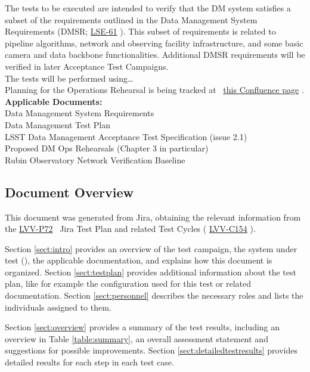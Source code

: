 \documentclass[DM,lsstdraft,STR,toc]{lsstdoc}
\begin{document}
 The tests to be executed are intended to verify that the DM system
satisfies a subset of the requirements outlined in the Data Management
System Requirements (DMSR; \href{https://lse-61.lsst.io/}{LSE-61} ).
This subset of requirements is related to pipeline algorithms, network
and observing facility infrastructure, and some basic camera and data
backbone functionalities. Additional DMSR requirements will be verified
in later Acceptance Test Campaigns.\\[2\baselineskip]The tests will be
performed using\ldots{}\\[2\baselineskip]Planning for the Operations
Rehearsal is being tracked at~
\href{https://confluence.lsstcorp.org/display/DM/Operations+Rehearsal+\%232}{this
Confluence page} .\\[2\baselineskip]\textbf{Applicable
Documents:}\\[2\baselineskip] Data Management System
Requirements\\
 Data Management Test Plan\\
 LSST Data Management Acceptance Test Specification (issue 2.1)\\
 Proposed DM Ops Rehearsals (Chapter 3 in particular)\\
 Rubin Observatory Network Verification Baseline


\subsection{Document Overview}
\label{sect:docoverview}

This document was generated from Jira, obtaining the relevant information from the
\href{https://jira.lsstcorp.org/secure/Tests.jspa\#/testPlan/LVV-P72}{LVV-P72}
~Jira Test Plan and related Test Cycles (
\href{https://jira.lsstcorp.org/secure/Tests.jspa\#/testCycle/LVV-C154}{LVV-C154}
).

Section \ref{sect:intro} provides an overview of the test campaign, the system under test (\product{}),
the applicable documentation, and explains how this document is organized.
Section \ref{sect:testplan} provides additional information about the test plan, like for example the configuration
used for this test or related documentation.
Section \ref{sect:personnel} describes the necessary roles and lists the individuals assigned to them.

Section \ref{sect:overview} provides a summary of the test results, including an overview in Table \ref{table:summary},
an overall assessment statement and suggestions for possible improvements.
Section \ref{sect:detailedtestresults} provides detailed results for each step in each test case.
\end{document}
